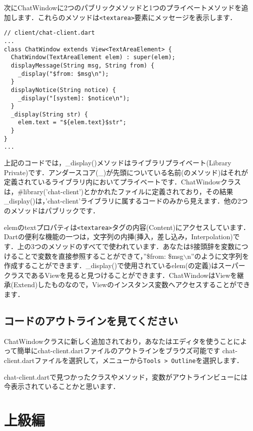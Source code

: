 次にChatWindowに2つのパブリックメソッドと1つのプライベートメソッドを追加します．これらのメソッドは\verb|<textarea>|要素にメッセージを表示します．

\begin{verbatim}
// client/chat-client.dart
...
class ChatWindow extends View<TextAreaElement> {
  ChatWindow(TextAreaElement elem) : super(elem);
  displayMessage(String msg, String from) {
    _display("$from: $msg\n");
  }
  displayNotice(String notice) {
    _display("[system]: $notice\n");
  }
  _display(String str) {
    elem.text = "${elem.text}$str";
  }
}
...
\end{verbatim}

上記のコードでは，\_display()メソッドはライブラリプライベート(Library Private)です．アンダースコア(\_)が先頭についている名前(のメソッド)はそれが定義されているライブラリ内においてプライベートです．ChatWindowクラスは，\#library('chat-client')とかかれたファイルに定義されており，その結果\_display()は，'chat-client'ライブラリに属するコードのみから見えます．他の2つのメソッドはパブリックです．

elemのtextプロパティは\verb|<textarea>|タグの内容(Content)にアクセスしています．Dartの便利な機能の一つは，文字列の内挿(挿入，差し込み，Interpolation)です．上の3つのメソッドのすべてで使われています．あなたは\$接頭辞を変数につけることで変数を直接参照することができて，''\$from: \$msg$\backslash$n''のように文字列を作成することができます．\_display()で使用されているelem(の定義)はスーパークラスであるViewを見ると見つけることができます．ChatWindowはViewを継承(Extend)したものなので，Viewのインスタンス変数へアクセスすることができます．

\subsection{コードのアウトラインを見てください}

ChatWindowクラスに新しく追加されており，あなたはエディタを使うことによって簡単にchat-client.dartファイルのアウトラインをブラウズ可能です
chat-client.dartファイルを選択して，メニューから\verb|Tools > Outline|を選択します．


chat-client.dartで見つかったクラスやメソッド，変数がアウトラインビューには今表示されていることかと思います．


\section{上級編}

